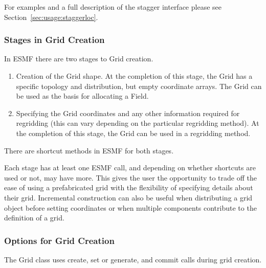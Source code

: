 For examples and a full description of the stagger interface 
please see Section~\ref{sec:usage:staggerloc}. 

\subsubsection{Stages in Grid Creation} 

In ESMF there are two stages to Grid creation.
\begin{enumerate}
\item Creation of the Grid shape.  At the completion of this
stage, the Grid has a specific topology and distribution, but
empty coordinate arrays.  The Grid can be used as the basis for
allocating a Field.
\item Specifying the Grid coordinates and any other information
required for regridding (this can vary depending on the 
particular regridding method).  At the completion of this
stage, the Grid can be used in a regridding method.
\end{enumerate}
There are shortcut methods in ESMF for both stages.

Each stage has at least one ESMF call, and depending on 
whether shortcuts are used or not, may have more.
This gives the user the opportunity to trade off the 
ease of using a prefabricated grid with the flexibility 
of specifying details about their grid.  Incremental
construction can also be useful when distributing a grid object
before setting coordinates or when multiple components
contribute to the definition of a grid. 

\medskip
\subsubsection{Options for Grid Creation}

The Grid class uses create, set or generate, and 
commit calls during grid creation.

